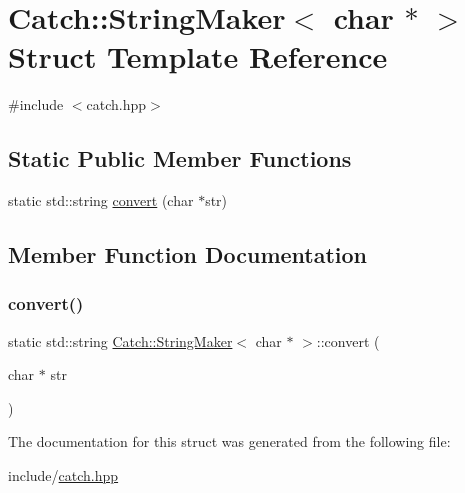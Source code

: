 \hypertarget{structCatch_1_1StringMaker_3_01char_01_5_01_4}{}\section{Catch\+:\+:String\+Maker$<$ char $\ast$ $>$ Struct Template Reference}
\label{structCatch_1_1StringMaker_3_01char_01_5_01_4}


{\ttfamily \#include $<$catch.\+hpp$>$}

\subsection*{Static Public Member Functions}
\begin{DoxyCompactItemize}
\item 
static std\+::string \mbox{\hyperlink{structCatch_1_1StringMaker_3_01char_01_5_01_4_a33049e24281ea6fba48bd8817bdd52bd}{convert}} (char $\ast$str)
\end{DoxyCompactItemize}


\subsection{Member Function Documentation}
\mbox{\label{structCatch_1_1StringMaker_3_01char_01_5_01_4_a33049e24281ea6fba48bd8817bdd52bd}} 
\subsubsection{\texorpdfstring{convert()}{convert()}}
{\footnotesize\ttfamily static std\+::string \mbox{\hyperlink{structCatch_1_1StringMaker}{Catch\+::\+String\+Maker}}$<$ char $\ast$ $>$\+::convert (\begin{DoxyParamCaption}\item[{char $\ast$}]{str }\end{DoxyParamCaption})\hspace{0.3cm}{\ttfamily [static]}}



The documentation for this struct was generated from the following file\+:\begin{DoxyCompactItemize}
\item 
include/\mbox{\hyperlink{catch_8hpp}{catch.\+hpp}}\end{DoxyCompactItemize}
